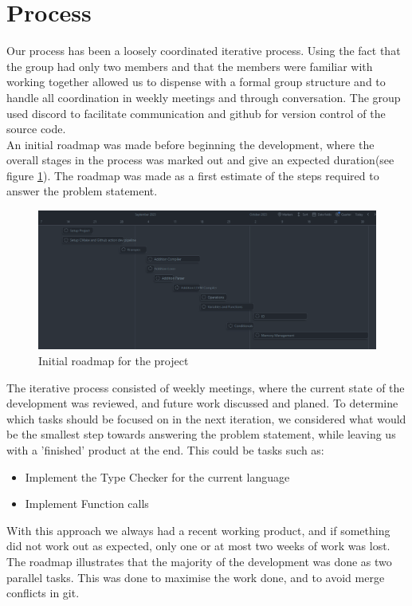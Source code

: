 \section{Process}
Our process has been a loosely coordinated iterative process. Using the fact that the group had only two members and that the members were familiar with working together allowed us to dispense with a formal group structure and to handle all coordination in weekly meetings and through conversation. The group used discord to facilitate communication and github for version control of the source code.\\

An initial roadmap was made before beginning the development, where the overall stages in the process was marked out and give an expected duration(see figure \ref{fig:iterate}). The roadmap was made as a first estimate of the steps required to answer the problem statement. 

\begin{figure}[h]
\centering
\includegraphics[width=\textwidth]{02-Body/Images/Roadmap.png}
\caption{Initial roadmap for the project}
\label{fig:iterate}
\end{figure}

The iterative process consisted of weekly meetings, where the current state of the development was reviewed, and future work discussed and planed. To determine which tasks should be focused on in the next iteration, we considered what would be the smallest step towards answering the problem statement, while leaving us with a 'finished' product at the end. This could be tasks such as:
\begin{itemize}
\item Implement the Type Checker for the current language
\item Implement Function calls
\end{itemize} 

With this approach we always had a recent working product, and if something did not work out as expected, only one or at most two weeks of work was lost. The roadmap illustrates that the majority of the development was done as two parallel tasks. This was done to maximise the work done, and to avoid merge conflicts in git.